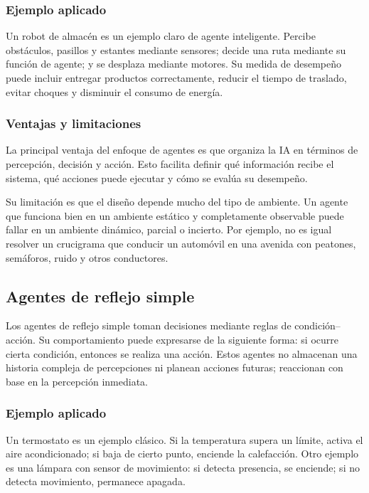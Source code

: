 \subsubsection{Ejemplo aplicado}

Un robot de almacén es un ejemplo claro de agente inteligente. Percibe obstáculos, pasillos y estantes mediante sensores; decide una ruta mediante su función de agente; y se desplaza mediante motores. Su medida de desempeño puede incluir entregar productos correctamente, reducir el tiempo de traslado, evitar choques y disminuir el consumo de energía.

\subsubsection{Ventajas y limitaciones}

La principal ventaja del enfoque de agentes es que organiza la IA en términos de percepción, decisión y acción. Esto facilita definir qué información recibe el sistema, qué acciones puede ejecutar y cómo se evalúa su desempeño.

Su limitación es que el diseño depende mucho del tipo de ambiente. Un agente que funciona bien en un ambiente estático y completamente observable puede fallar en un ambiente dinámico, parcial o incierto. Por ejemplo, no es igual resolver un crucigrama que conducir un automóvil en una avenida con peatones, semáforos, ruido y otros conductores.

\subsection{Agentes de reflejo simple}

Los agentes de reflejo simple toman decisiones mediante reglas de condición--acción. Su comportamiento puede expresarse de la siguiente forma: si ocurre cierta condición, entonces se realiza una acción. Estos agentes no almacenan una historia compleja de percepciones ni planean acciones futuras; reaccionan con base en la percepción inmediata.

\subsubsection{Ejemplo aplicado}

Un termostato es un ejemplo clásico. Si la temperatura supera un límite, activa el aire acondicionado; si baja de cierto punto, enciende la calefacción. Otro ejemplo es una lámpara con sensor de movimiento: si detecta presencia, se enciende; si no detecta movimiento, permanece apagada.


